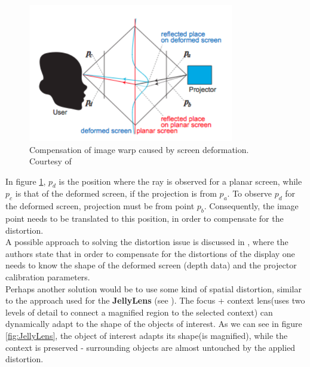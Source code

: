\documentclass[]{article}
\begin{document}
\begin{figure}[hbtp]
    \centering
    \includegraphics[width=0.8\textwidth]{figures/PointProjection.PNG}
    \caption{Compensation of image warp caused by screen deformation. Courtesy of \cite{watanabe08}}
    \label{fig:PointCompensation}
\end{figure}

In figure \ref{fig:PointCompensation}, $p_{d}$ is the position where the ray is observed for a planar screen, while $p_{c}$ is that of the deformed screen, if the projection is from $p_{a}$. To observe $p_{d}$ for the deformed screen, projection must be from point $p_{b}$. Consequently, the image point needs to be translated to this position, in order to compensate for the distortion.\\

A possible approach to solving the distortion issue is discussed in \cite{watanabe08}, where the authors state that in order to compensate for the distortions of the display one needs to know the shape of the deformed screen (depth data) and the projector calibration parameters. \\

Perhaps another solution would be to use some kind of spatial distortion, similar to the approach used for the \textbf{JellyLens} (see \cite{pindat12}). The focus + context lens(uses two levels of detail to connect a magnified region to the selected context)  can dynamically adapt to the shape of the objects of interest. As we can see in figure  \ref{fig:JellyLens}, the object of interest adapts its shape(is magnified), while the context is preserved - surrounding objects are almost untouched by the applied distortion.
\end{document}
